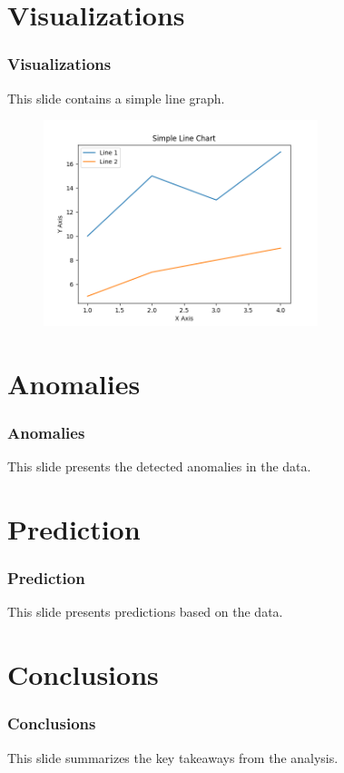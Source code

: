 \documentclass{beamer}%
\begin{document}
\section{Visualizations}%
\label{sec:Visualizations}%
\begin{frame}%
\frametitle{Visualizations}%
This slide contains a simple line graph.%


\begin{figure}[h!]%
\centering%
\includegraphics[width=80mm]{line_chart.png}%
\end{figure}

%
\end{frame}

%
\section{Anomalies}%
\label{sec:Anomalies}%
\begin{frame}%
\frametitle{Anomalies}%
This slide presents the detected anomalies in the data.%
\end{frame}

%
\section{Prediction}%
\label{sec:Prediction}%
\begin{frame}%
\frametitle{Prediction}%
This slide presents predictions based on the data.%
\end{frame}

%
\section{Conclusions}%
\label{sec:Conclusions}%
\begin{frame}%
\frametitle{Conclusions}%
This slide summarizes the key takeaways from the analysis.%
\end{frame}

%
\end{document}
